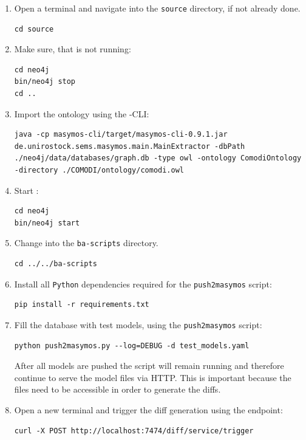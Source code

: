 \begin{enumerate}
	\item Open a terminal and navigate into the \texttt{source} directory, if not already done.
\begin{lstlisting}
cd source
\end{lstlisting}

	\item Make sure, that \neoj is not running:
\begin{lstlisting}
cd neo4j
bin/neo4j stop
cd ..
\end{lstlisting}

	\item Import the \comodi ontology using the \masymos-CLI:
\begin{lstlisting}
java -cp masymos-cli/target/masymos-cli-0.9.1.jar de.unirostock.sems.masymos.main.MainExtractor -dbPath ./neo4j/data/databases/graph.db -type owl -ontology ComodiOntology -directory ./COMODI/ontology/comodi.owl
\end{lstlisting}

	\item Start \neoj:
\begin{lstlisting}
cd neo4j
bin/neo4j start
\end{lstlisting}

	\item Change into the \texttt{ba-scripts} directory.
\begin{lstlisting}
cd ../../ba-scripts
\end{lstlisting}
	
	\pagebreak
	\item Install all \texttt{Python} dependencies required for the \texttt{push2masymos} script:
\begin{lstlisting}
pip install -r requirements.txt
\end{lstlisting}

	\item Fill the database with test models, using the \texttt{push2masymos} script:
\begin{lstlisting}
python push2masymos.py --log=DEBUG -d test_models.yaml
\end{lstlisting}
	After all models are pushed the script will remain running and therefore continue to serve the model files via HTTP. This is important because the files need to be accessible in order to generate the diffs.

	\item Open a new terminal and trigger the diff generation using the \rest endpoint:
\begin{lstlisting}
curl -X POST http://localhost:7474/diff/service/trigger
\end{lstlisting}
	

\end{enumerate}
